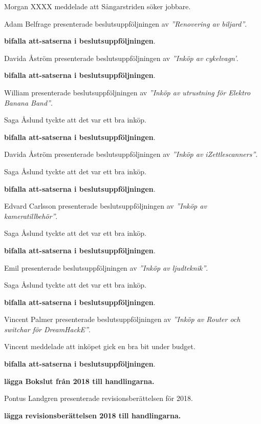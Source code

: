 \documentclass[10pt]{article}
\begin{document}
\begin{paragrafer}
Morgan XXXX meddelade att Sångarstriden söker jobbare.


Adam Belfrage presenterade beslutsuppföljningen av \emph{''Renovering av biljard''}.

\textbf{\Mba bifalla att-satserna i beslutsuppföljningen}.


Davida Åström presenterade beslutsuppföljningen av \emph{''Inköp av cykelvagn'}.

\textbf{\Mba bifalla att-satserna i beslutsuppföljningen}.

William presenterade beslutsuppföljningen av \emph{''Inköp av utrustning för Elektro Banana Band''}.

Saga Åslund tyckte att det var ett bra inköp. 

\textbf{\Mba bifalla att-satserna i beslutsuppföljningen}.

Davida Åström presenterade beslutsuppföljningen av \emph{''Inköp av iZettlescanners''}.

Saga Åslund tyckte att det var ett bra inköp. 

\textbf{\Mba bifalla att-satserna i beslutsuppföljningen}.

Edvard Carlsson presenterade beslutsuppföljningen av \emph{''Inköp av kameratillbehör''}.

Saga Åslund tyckte att det var ett bra inköp. 

\textbf{\Mba bifalla att-satserna i beslutsuppföljningen}.

Emil presenterade beslutsuppföljningen av \emph{''Inköp av ljudteknik''}.

Saga Åslund tyckte att det var ett bra inköp. 

\textbf{\Mba bifalla att-satserna i beslutsuppföljningen}.

Vincent Palmer presenterade beslutsuppföljningen av \emph{''Inköp av Router och switchar för DreamHackE''}.

Vincent meddelade att inköpet gick en bra bit under budget. 

\textbf{\Mba bifalla att-satserna i beslutsuppföljningen}.


\textbf{\Mba lägga Bokslut från 2018 till handlingarna.}

Pontus Landgren presenterade revisionsberättelsen för 2018. 

\textbf{\Mba lägga revisionsberättelsen 2018 till handlingarna.}


\end{paragrafer}
\end{document}
